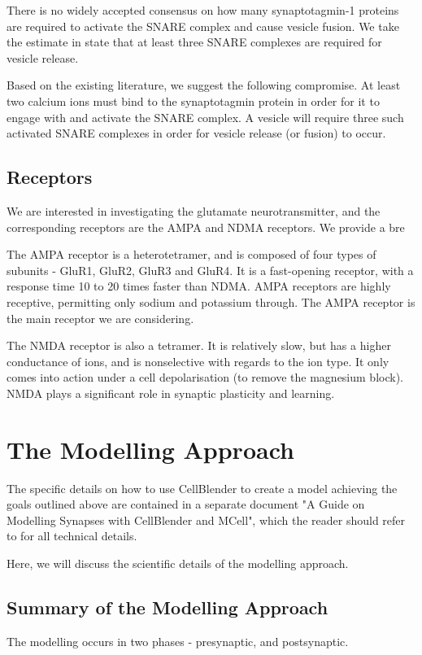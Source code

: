 \documentclass[a4paper]{article}
\begin{document}
There is no widely accepted consensus on how many synaptotagmin-1 proteins are required to activate the SNARE complex and cause vesicle fusion. We take the estimate in \cite{Dittrich:BiophysJ:2013} state that at least three SNARE complexes are required for vesicle release.

Based on the existing literature, we suggest the following compromise. At least two calcium ions must bind to the synaptotagmin protein in order for it to engage with and activate the SNARE complex. A vesicle will require three such activated SNARE complexes in order for vesicle release (or fusion) to occur.

\subsection{Receptors}
We are interested in investigating the glutamate neurotransmitter, and the corresponding receptors are the AMPA and NDMA receptors. We provide a bre

The AMPA receptor is a heterotetramer, and is composed of four types of subunits - GluR1, GluR2, GluR3 and GluR4. It is a fast-opening receptor, with a response time 10 to 20 times faster than NDMA. AMPA receptors are highly receptive, permitting only sodium and potassium through. The AMPA receptor is the main receptor we are considering.

The NMDA receptor is also a tetramer. It is relatively slow, but has a higher conductance of ions, and is nonselective with regards to the ion type. It only comes into action under a cell depolarisation (to remove the magnesium block). NMDA plays a significant role in synaptic plasticity and learning.

\section{The Modelling Approach}

The specific details on how to use CellBlender to create a model achieving the goals outlined above are contained in a separate document "A Guide on Modelling Synapses with CellBlender and MCell", which the reader should refer to for all technical details.

Here, we will discuss the scientific details of the modelling approach.

\subsection{Summary of the Modelling Approach}
The modelling occurs in two phases - presynaptic, and postsynaptic.
\end{document}
